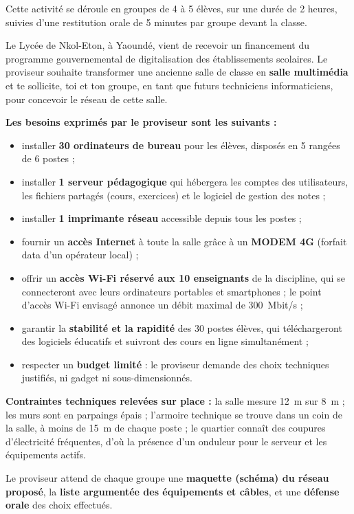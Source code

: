 \documentclass[11pt]{article}
\newcounter{popsec}
\newcounter{popsub}
\newcommand{\courssub}[1]{%
  \stepcounter{popsub}%
  \par\vspace{9pt}\noindent{\popxbold\fontsize{11.5}{13}\selectfont\color{popink}{\color{poporange}\thepopsec.\thepopsub}\hspace{6pt}#1}\par\nopagebreak\vspace{4pt}
}
\begin{document}
Cette activité se déroule en groupes de 4 à 5 élèves, sur une durée de 2 heures, suivies d'une restitution orale de 5 minutes par groupe devant la classe.

\courssub{Situation}

\begin{exemplebox}
Le Lycée de Nkol-Eton, à Yaoundé, vient de recevoir un financement du programme gouvernemental de digitalisation des établissements scolaires. Le proviseur souhaite transformer une ancienne salle de classe en \textbf{salle multimédia} et te sollicite, toi et ton groupe, en tant que futurs techniciens informaticiens, pour concevoir le réseau de cette salle.

\textbf{Les besoins exprimés par le proviseur sont les suivants :}

\begin{itemize}
\item installer \textbf{30 ordinateurs de bureau} pour les élèves, disposés en 5 rangées de 6 postes ;
\item installer \textbf{1 serveur pédagogique} qui hébergera les comptes des utilisateurs, les fichiers partagés (cours, exercices) et le logiciel de gestion des notes ;
\item installer \textbf{1 imprimante réseau} accessible depuis tous les postes ;
\item fournir un \textbf{accès Internet} à toute la salle grâce à un \textbf{MODEM 4G} (forfait data d'un opérateur local) ;
\item offrir un \textbf{accès Wi-Fi réservé aux 10 enseignants} de la discipline, qui se connecteront avec leurs ordinateurs portables et smartphones ; le point d'accès Wi-Fi envisagé annonce un débit maximal de \SI{300}{Mbit/s} ;
\item garantir la \textbf{stabilité et la rapidité} des 30 postes élèves, qui téléchargeront des logiciels éducatifs et suivront des cours en ligne simultanément ;
\item respecter un \textbf{budget limité} : le proviseur demande des choix techniques justifiés, ni gadget ni sous-dimensionnés.
\end{itemize}

\textbf{Contraintes techniques relevées sur place :} la salle mesure \SI{12}{m} sur \SI{8}{m} ; les murs sont en parpaings épais ; l'armoire technique se trouve dans un coin de la salle, à moins de \SI{15}{m} de chaque poste ; le quartier connaît des coupures d'électricité fréquentes, d'où la présence d'un onduleur pour le serveur et les équipements actifs.

Le proviseur attend de chaque groupe une \textbf{maquette (schéma) du réseau proposé}, la \textbf{liste argumentée des équipements et câbles}, et une \textbf{défense orale} des choix effectués.
\end{exemplebox}
\end{document}
